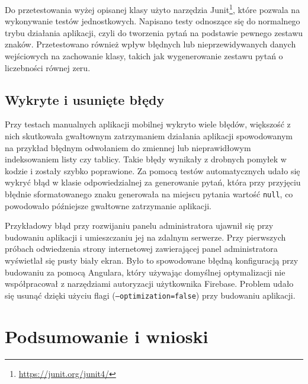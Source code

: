 \documentclass[a4paper,twoside,12pt]{book}
\begin{document}
Do przetestowania wyżej opisanej klasy użyto narzędzia Junit\footnote{\url{https://junit.org/junit4/}}, które pozwala na wykonywanie testów jednostkowych. Napisano testy odnoszące się do normalnego trybu działania aplikacji, czyli do tworzenia pytań na podstawie pewnego zestawu znaków. Przetestowano również wpływ błędnych lub nieprzewidywanych danych wejściowych na zachowanie klasy, takich jak wygenerowanie zestawu pytań o liczebności równej zeru. 

\section{Wykryte i usunięte błędy}

Przy testach manualnych aplikacji mobilnej wykryto wiele błędów, większość z nich skutkowała gwałtownym zatrzymaniem działania aplikacji spowodowanym na przykład błędnym odwołaniem do zmiennej lub nieprawidłowym indeksowaniem listy czy tablicy. Takie błędy wynikały z drobnych pomyłek w kodzie i zostały szybko poprawione. Za pomocą testów automatycznych udało się wykryć błąd w klasie odpowiedzialnej za generowanie pytań, która przy przyjęciu błędnie sformatowanego znaku generowała na miejscu pytania wartość \texttt{null}, co powodowało późniejsze gwałtowne zatrzymanie aplikacji.

Przykładowy błąd przy rozwijaniu panelu administratora ujawnił się przy budowaniu aplikacji i umieszczaniu jej na zdalnym serwerze. Przy pierwszych próbach odwiedzenia strony internetowej zawierającej panel administratora wyświetlał się pusty biały ekran. Było to spowodowane błędną konfiguracją przy budowaniu za pomocą Angulara, który używając domyślnej optymalizacji nie współpracował z narzędziami autoryzacji użytkownika Firebase. Problem udało się usunąć dzięki użyciu flagi (\texttt{--optimization=false}) przy budowaniu aplikacji.

\chapter{Podsumowanie i wnioski}


\end{document}
